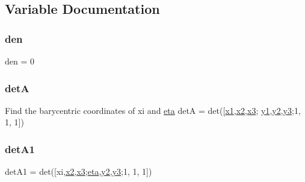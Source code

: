 \subsection{Variable Documentation}
\mbox{\label{a00605_a075a79fb221852f46c51b49f9d83204b}} 
\subsubsection{\texorpdfstring{den}{den}}
{\footnotesize\ttfamily den = 0}

\mbox{\label{a00605_aa97829eaebbb0f0e581837cfa2ea9357}} 
\subsubsection{\texorpdfstring{detA}{detA}}
{\footnotesize\ttfamily Find the barycentric coordinates of xi and \hyperlink{a00605_a28acc4a90fe6ffb907aa145b7b01326a}{eta} detA = det(\mbox{[}\hyperlink{a00605_ac39b33361203e68d7820336db48d45e6}{x1},\hyperlink{a00605_aab2463cd078f7c5368f6eb80f5a549b8}{x2},\hyperlink{a00605_a03ad2628eb1c540113251638112541e3}{x3}; \hyperlink{a00605_a7f911dc1dbbc41c6cae56357e8fb2230}{y1},\hyperlink{a00605_a41b94b12b7cb45b3ddee299d4e7b79e8}{y2},\hyperlink{a00605_ade1417f93b8addbf3d5a62e132e169fd}{y3};1, 1, 1\mbox{]})}

\mbox{\label{a00605_a9a8f5348c709ec185840d4c3447dab33}} 
\subsubsection{\texorpdfstring{det\+A1}{detA1}}
{\footnotesize\ttfamily det\+A1 = det(\mbox{[}xi,\hyperlink{a00605_aab2463cd078f7c5368f6eb80f5a549b8}{x2},\hyperlink{a00605_a03ad2628eb1c540113251638112541e3}{x3};\hyperlink{a00605_a28acc4a90fe6ffb907aa145b7b01326a}{eta},\hyperlink{a00605_a41b94b12b7cb45b3ddee299d4e7b79e8}{y2},\hyperlink{a00605_ade1417f93b8addbf3d5a62e132e169fd}{y3};1, 1, 1\mbox{]})}

\mbox{\label{a00605_ac6b1fc12c876ba461ffba834a6d98a51}} 
